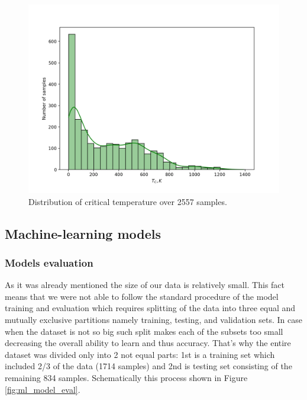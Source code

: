 \begin{figure}[H]
	\centering
	\includegraphics[width=160mm]{fig/ml_fig/tc_distrib.png}
	\caption[$T_C$ distribution histogram over 2557 samples]{Distribution of critical temperature over 2557 samples.}
\label{fig:tc_distrib}
\end{figure}

\subsection{Machine-learning models}

\subsubsection{Models evaluation}

As it was already mentioned the size of our data is relatively small. This fact means that we were not able to follow the standard procedure of the model training and evaluation which requires splitting of the data into three equal and mutually exclusive partitions namely training, testing, and validation sets. In case when the dataset is not so big such split makes each of the subsets too small decreasing the overall ability to learn and thus accuracy. That’s why the entire dataset was divided only into 2 not equal parts: 1st is a training set which included 2/3 of the data (1714 samples) and 2nd is testing set consisting of the remaining 834 samples. Schematically this process shown in Figure \ref{fig:ml_model_eval}.

